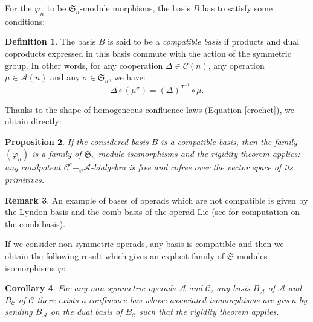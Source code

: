 \documentclass[11pt,leqno]{amsart}
\theoremstyle{definition}
\newtheorem{definition}{Definition}[subsection]
\newtheorem{remark}[definition]{Remark}
\theoremstyle{plain}
\newtheorem{proposition}[definition]{Proposition}
\newtheorem{corollary}[definition]{Corollary}
\newcommand{\A}{ \mathcal{A} }
\newcommand{\C}{ \mathcal{C} }
\begin{document}
For the $\varphi_n$ to be $\mathfrak{S}_n$-module morphisms, the basis $B$ has to satisfy some conditions:
\begin{definition}

The basis $B$ is said to be a \emph{compatible basis} if products and dual coproducts expressed in this basis commute with the action of the symmetric group. In other words, for any cooperation $\Delta \in \C(n)$, any operation $\mu \in \A(n)$ and any $\sigma \in \mathfrak{S}_n$, we have:
\begin{equation*}
\Delta \circ (  \mu^{\sigma}) = ( \Delta)^{\sigma^{-1}} \circ \mu.
\end{equation*}

\end{definition}

Thanks to the shape of homogeneous confluence laws (Equation \eqref{crochet}), we obtain directly:

\begin{proposition}
If the considered basis $B$ is a compatible basis, then the family $(\varphi_n)$ is a family of $\mathfrak{S}_n$-module isomorphisms and the rigidity theorem applies: any conilpotent $\C^c-_{\varphi}\A$-bialgebra is free and cofree over the vector space of its primitives. \end{proposition}

\begin{remark} An example of bases of operads which are not compatible is given by the Lyndon basis and the comb basis of the operad Lie (see \cite{HoffVesp} for computation on the comb basis).
\end{remark}

If we consider non symmetric operads, any basis is compatible and then we obtain the following result which gives an explicit family of $\mathfrak{S}$-modules isomorphisms $\varphi$:

\begin{corollary}
For any non symmetric operads $\A$ and $\C$, any basis $B_{\A}$ of $\A$ and $B_{\C}$ of $\C$ there exists a confluence law whose associated isomorphisms are given by sending $B_{\A}$ on the dual basis of $B_{\C}$ such that the rigidity theorem applies. 
\end{corollary}
\end{document}
